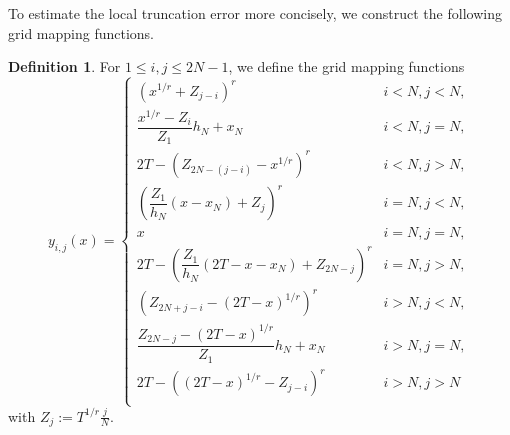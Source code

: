\documentclass{amsart}
\theoremstyle{definition}
\newtheorem{definition}[theorem]{Definition}
\theoremstyle{remark}
\numberwithin{equation}{section}
\begin{document}
To estimate the local truncation error more concisely, we construct the following grid mapping functions.




\begin{definition} 
\label{def:gridmapfunc}
  For \(1\le i, j \le 2N-1\), we define the grid mapping functions
  \begin{equation} \label{def:yij}
    y_{i,j}(x) = \begin{cases}
      (x^{1/r} + Z_{j-i})^r               & i< N, j< N, \\
      \dfrac{x^{1/r} - Z_i}{Z_1} h_N + x_N  & i< N, j=N, \\
      2T - (Z_{2N-(j-i)} - x^{1/r})^r     & i< N, j>N, \\
      \left(\dfrac{Z_1}{h_N}  (x-x_N) + Z_j \right)^r  & i=N, j< N, \\
      x                                   & i=N, j=N, \\
      2T - \left(\dfrac{Z_1}{h_N}  (2T-x-x_N) + Z_{2N-j} \right)^r   & i=N , j > N, \\
      (Z_{2N+j-i} - (2T - x)^{1/r})^r  & i > N, j< N, \\
      \dfrac{Z_{2N-j} - (2T-x)^{1/r}}{Z_1} h_N + x_N  & i > N, j=N, \\
      2T-((2T-x)^{1/r}-Z_{j-i})^r & i > N, j> N \\
    \end{cases}
  \end{equation}
  with  \( Z_{j} := T^{1/r}\frac{j}{N} \).
\end{definition}
\end{document}
